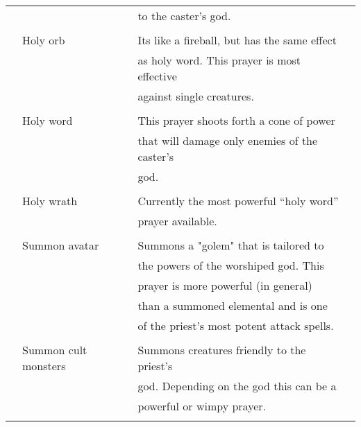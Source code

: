 {{{\begin{table}
\begin{center}
\begin{tabular}{|p{0.5cm}llp{0.5cm}|}
&                                     &  to the caster's god. & \\
 & & & \\
&        Holy orb              &  Its like a fireball, but has the same effect & \\
&			     &  as holy word\tablenotemark{2}. This prayer is most effective & \\
&			& against single creatures. & \\
 & & & \\
&        Holy word\tablenotemark{2} &  This prayer shoots forth a cone of power & \\
&				     &  that will damage only enemies of the caster's & \\
       &                              &  god. & \\
 & & & \\
       & Holy wrath           &  Currently the most powerful ``holy word''\tablenotemark{2} & \\
       &                              &  prayer available. & \\
 & & & \\
       & Summon avatar         &  Summons a "golem" that is tailored to & \\
       &                              &  the powers of the worshiped god. This & \\
       &                              &  prayer is more powerful (in general) & \\
       &                              &  than a summoned elemental and is one & \\
       &                              &  of the priest's most potent attack spells. & \\
 & & & \\
       & Summon cult monsters  &  	Summons creatures friendly to the priest's & \\
       &                              &  god. Depending on the god this can be a & \\
       &                              &   powerful or wimpy prayer. & \\
 & & & \\
\hline
\end{tabular}
\end{center}
\end{table}

}}}
